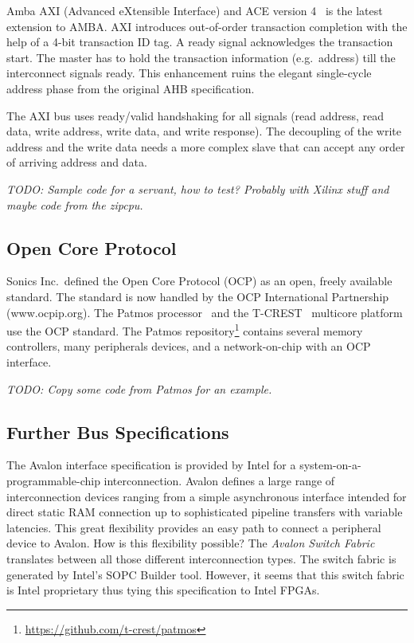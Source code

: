 \documentclass[%
    10pt,
    headinclude, footexclude,
    openright, %
    notitlepage,
    cleardoubleempty,
    headsepline,
    pointlessnumbers,
    bibtotoc, idxtotoc,
    ]{scrbook}
\newcommand{\todo}[1]{{\emph{TODO: #1}}}
\begin{document}
Amba AXI (Advanced eXtensible Interface) and ACE
version 4~\cite{axi4standard}  is the latest
extension to AMBA. AXI introduces out-of-order transaction
completion with the help of a 4-bit transaction ID tag. A ready
signal acknowledges the transaction start. The master has to hold
the transaction information (e.g.\ address) till the interconnect
signals ready. This enhancement ruins the elegant single-cycle
address phase from the original AHB specification.

The AXI bus uses ready/valid handshaking for all signals (read address,
read data, write address, write data, and write response).
The decoupling of the write address and the write data needs a more complex
slave that can accept any order of arriving address and data.


\todo{Sample code for a servant, how to test? Probably with Xilinx stuff and maybe
code from the zipcpu.}

\subsection{Open Core Protocol}

Sonics Inc.\ defined the Open Core Protocol (OCP) \cite{soc:ocp} as
an open, freely available standard. The standard is now handled by
the OCP International Partnership (www.ocpip.org).
The Patmos processor~\cite{patmos:rts2018} and the
T-CREST~\cite{t-crest:2015} multicore platform use the OCP
standard. The Patmos repository\footnote{\url{https://github.com/t-crest/patmos}}
contains several memory controllers, many peripherals devices,
and a network-on-chip with an OCP interface.

\todo{Copy some code from Patmos for an example.}

\subsection{Further Bus Specifications}

The Avalon \cite{soc:avalon} interface specification is provided by
Intel for a system-on-a-\\programmable-chip interconnection.
Avalon defines a large range of interconnection devices ranging from
a simple asynchronous interface intended for direct static RAM
connection up to sophisticated pipeline transfers with variable
latencies. This great flexibility provides an easy path to connect a
peripheral device to Avalon. How is this flexibility possible? The
\emph{Avalon Switch Fabric} translates between all those different
interconnection types. The switch fabric is generated by Intel's
SOPC Builder tool. However, it seems that this switch fabric is
Intel proprietary thus tying this specification to Intel FPGAs.
\end{document}
